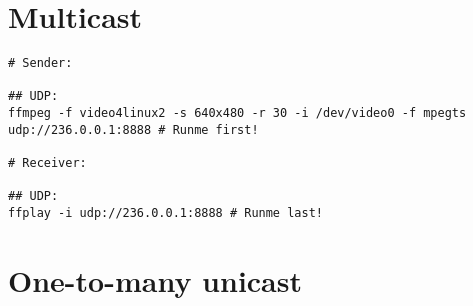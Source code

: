 
\section{Multicast}

\begin{verbatim}
# Sender:

## UDP:
ffmpeg -f video4linux2 -s 640x480 -r 30 -i /dev/video0 -f mpegts udp://236.0.0.1:8888 # Runme first!

# Receiver:

## UDP:
ffplay -i udp://236.0.0.1:8888 # Runme last!
\end{verbatim}


\section{One-to-many unicast}

